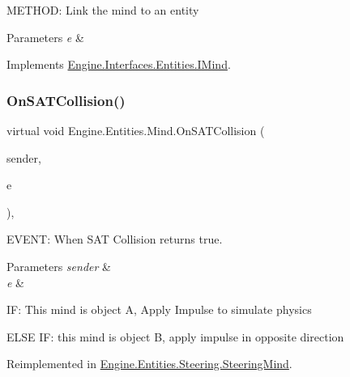 M\+E\+T\+H\+OD\+: Link the mind to an entity 


\begin{DoxyParams}{Parameters}
{\em e} & \\
\hline
\end{DoxyParams}


Implements \hyperlink{a00446_a9d8370ad6e1b2a07760d3554b1e179fd}{Engine.\+Interfaces.\+Entities.\+I\+Mind}.

\mbox{\label{a00318_ac278d4358d794426251d1b87b6aa7b82}} 
\subsubsection{\texorpdfstring{On\+S\+A\+T\+Collision()}{OnSATCollision()}}
{\footnotesize\ttfamily virtual void Engine.\+Entities.\+Mind.\+On\+S\+A\+T\+Collision (\begin{DoxyParamCaption}\item[{object}]{sender,  }\item[{\hyperlink{a00350}{Collision\+Event\+Args}}]{e }\end{DoxyParamCaption})\hspace{0.3cm}{\ttfamily [inline]}, {\ttfamily [virtual]}}



E\+V\+E\+NT\+: When S\+AT Collision returns true. 


\begin{DoxyParams}{Parameters}
{\em sender} & \\
\hline
{\em e} & \\
\hline
\end{DoxyParams}
IF\+: This mind is object A, Apply Impulse to simulate physics

E\+L\+SE IF\+: this mind is object B, apply impulse in opposite direction 

Reimplemented in \hyperlink{a00346_a4834c17e78fd0bf82940ca0a4e8966f9}{Engine.\+Entities.\+Steering.\+Steering\+Mind}.

\mbox{\label{a00318_a08db67e6cb8d5ff8015afa4fb780c5e8}} 
